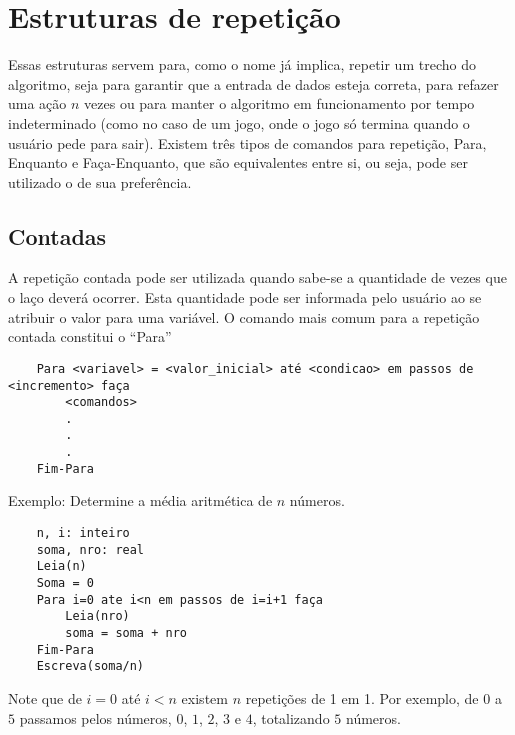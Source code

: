 \chapter{Estruturas de repetição}
Essas estruturas servem para, como o nome já implica, repetir um trecho do algoritmo, seja para garantir que a entrada de dados esteja correta, para refazer uma ação $n$ vezes ou para manter o algoritmo em funcionamento por tempo indeterminado (como no caso de um jogo, onde o jogo só termina quando o usuário pede para sair). Existem três tipos de comandos para repetição, Para, Enquanto e Faça-Enquanto, que são equivalentes entre si, ou seja, pode ser utilizado o de sua preferência.
\section{Contadas}
A repetição contada pode ser utilizada quando sabe-se a quantidade de vezes que o laço deverá ocorrer. Esta quantidade pode ser informada pelo usuário ao se atribuir o valor para uma variável. O comando mais comum para a repetição contada constitui o ``Para''\\
\begin{lstlisting}
    Para <variavel> = <valor_inicial> até <condicao> em passos de <incremento> faça
        <comandos>
        .
        .
        .
    Fim-Para
\end{lstlisting}
Exemplo: Determine a média aritmética de $n$ números.
\begin{lstlisting}
    n, i: inteiro
    soma, nro: real
    Leia(n)
    Soma = 0
    Para i=0 ate i<n em passos de i=i+1 faça
        Leia(nro)
        soma = soma + nro
    Fim-Para
    Escreva(soma/n)
\end{lstlisting}
Note que de $i = 0$ até $i < n$ existem $n$ repetições de 1 em 1. Por exemplo, de $0$ a $5$ passamos pelos números, $0$, $1$, $2$, $3$ e $4$, totalizando $5$ números.
